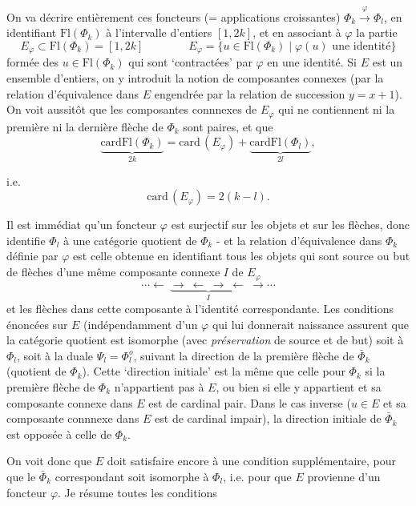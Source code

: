 \documentclass[11pt]{article}
\newcommand{\printedpage}[1]{\marginpar{\footnotesize p.~#1}}
\newcommand{\msp}[1]{\marginpar{\footnotesize [#1]}}
\newcommand{\Fl}{\mathrm{Fl}}
\newcommand{\card}{\mathrm{card}}
\begin{document}
On va décrire entièrement ces foncteurs (= applications croissantes) $\Phi_k\xrightarrow{\varphi}\Phi_l$, en identifiant $\Fl(\Phi_k)$ à l'intervalle d'entiers $[1,2k]$, et en associant à $\varphi$ la partie
\[
E_\varphi\subset\Fl(\Phi_k)=[1,2k]\qquad\qquad E_\varphi=\{u\in\Fl(\Phi_k)\mid\varphi(u)\text{ une identité}\}
\]
formée des $u\in\Fl(\Phi_k)$ qui sont `contractées' par $\varphi$ en une identité. Si $E$ est un ensemble d'entiers, on y introduit la notion de composantes connexes (par la relation d'équivalence dans $E$ engendrée par la relation de succession $y=x+1$). On voit aussitôt que les composantes connnexes de $E_\varphi$ qui ne contiennent ni la première ni la dernière flèche de $\Phi_k$ sont paires, et que %
\[
\underbrace{\card\Fl(\Phi_k)}_{2k}=\card\,(E_\varphi)+\underbrace{\card\Fl(\Phi_l)}_{2l},
\]

\msp{page 18}
i.e.
\[
\card\,(E_\varphi)=2(k-l).
\]


\printedpage{12}

Il est immédiat qu'un foncteur $\varphi$ est surjectif sur les objets et sur les flèches, donc identifie $\Phi_l$ à une catégorie quotient de $\Phi_k$ - et la relation d'équivalence dans $\Phi_k$ définie par $\varphi$ est celle obtenue en identifiant tous les objets qui sont source ou but de flèches d'une même composante connexe $I$ de $E_\varphi$
\[
\cdots\longleftarrow\ \underbrace{\longrightarrow\ \longleftarrow\ \longrightarrow\ \longleftarrow}_{I}\ \longrightarrow\cdots
\]
et les flèches dans cette composante à l'identité correspondante. Les conditions énoncées sur $E$ (indépendamment d'un $\varphi$ qui lui donnerait naissance assurent que la catégorie quotient est isomorphe (avec \textit{préservation} de source et de but) soit à $\Phi_l$, soit à la duale $\Psi_l=\Phi_l^o$, suivant la direction de la première flèche de $\bar{\Phi}_k$ (quotient de $\Phi_k$). Cette `direction initiale' est la même que celle pour $\Phi_k$ si la première flèche de $\Phi_k$ n'appartient pas à $E$, ou bien si elle y appartient et sa composante connexe dans $E$ est de cardinal pair. Dans le cas inverse ($u\in E$ et sa composante connnexe dans $E$ est de cardinal impair), la direction initiale de $\bar{\Phi}_k$ est opposée à celle de $\Phi_k$. %

\msp{page 19}
On voit donc que $E$ doit satisfaire encore à une condition supplémentaire, pour que le $\bar{\Phi}_k$ correspondant soit isomorphe à $\Phi_l$, i.e. pour que $E$ provienne d'un foncteur $\varphi$. Je résume toutes les conditions
\end{document}
